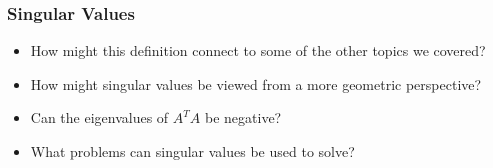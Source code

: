 \begin{frame}\frametitle{Singular Values}


    \begin{center}\end{center}
    
    \vspace{6pt}
    
    \pause
    
    \begin{itemize}
        \item<2-> How might this definition connect to some of the other topics we covered? 
        \item<3-> How might singular values be viewed from a more geometric perspective? 
        \item<4-> Can the eigenvalues of $A^TA$ be negative? 
        \item<5-> What problems can singular values be used to solve? 
    \end{itemize}
    
    \vspace{12pt}
    
\end{frame}



